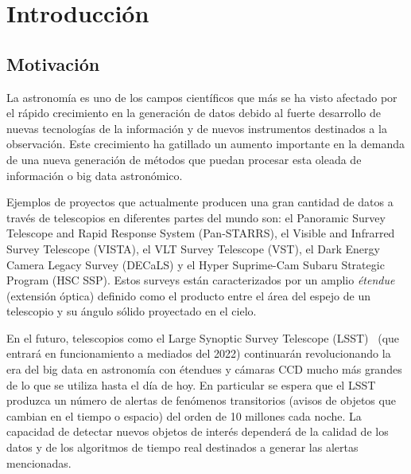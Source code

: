 \chapter{Introducción}
\label{ch:introduction}

\section{Motivaci\'on}
La astronomía es uno de los campos científicos que más se ha visto afectado por el rápido crecimiento en la generación de datos debido al fuerte desarrollo de nuevas tecnologías de la información y  de nuevos instrumentos destinados a la observación. Este crecimiento ha gatillado un aumento importante en la demanda de una nueva generaci\'on de m\'etodos que puedan procesar esta oleada de informaci\'on o big data astron\'omico.
\bigskip

Ejemplos de proyectos que actualmente producen una gran cantidad de datos a trav\'es de telescopios en diferentes partes del mundo son: el Panoramic Survey Telescope and Rapid Response System (Pan-STARRS)\cite{pan}, el Visible and Infrarred Survey Telescope (VISTA)\cite{vista}, el VLT Survey Telescope (VST)\cite{vst}, el Dark Energy Camera Legacy Survey (DECaLS)\cite{decals} y el Hyper Suprime-Cam Subaru Strategic Program (HSC SSP)\cite{ssp}. Estos surveys est\'an caracterizados por un amplio \textit{\'etendue} (extensi\'on \'optica) definido como el producto entre el \'area del espejo de un telescopio y su \'angulo s\'olido proyectado en el cielo.
\bigskip

En el futuro, telescopios como el Large Synoptic Survey Telescope (LSST)~\cite{lsst} (que entrará en funcionamiento a mediados del 2022) continuar\'an revolucionando la era del big data en astronom\'ia con \'etendues y c\'amaras CCD mucho m\'as grandes de lo que se utiliza hasta el d\'ia de hoy. En particular se espera que el LSST produzca un n\'umero de alertas de fen\'omenos transitorios (avisos de objetos que cambian en el tiempo o espacio) del orden de 10 millones cada noche. La capacidad de detectar nuevos objetos de inter\'es depender\'a de la calidad de los datos y de los algoritmos de tiempo real  destinados a generar las alertas mencionadas. 
\bigskip

